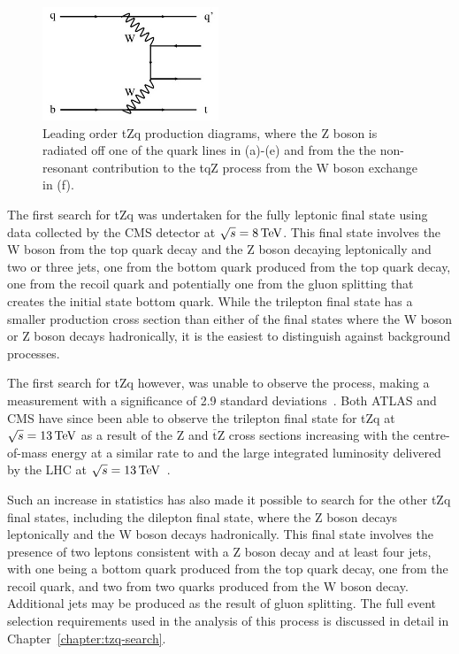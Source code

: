 \begin{figure}[p]
\includegraphics[width=0.47\textwidth]{figs/top-physics/tZq_feyn6.jpg}
\caption{Leading order tZq production diagrams, where the Z boson is radiated off one of the quark lines in (a)-(e) and from the the non-resonant contribution to the tqZ process from the W boson exchange in (f).}
\label{fig:feyn_tZq}
\end{figure}

The first search for tZq was undertaken for the fully leptonic final state using data collected by the CMS detector at $\sqrt{s} = 8\,\text{Te\hspace{-.08em}V}$.
This final state involves the W boson from the top quark decay and the Z boson decaying leptonically and two or three jets, one from the bottom quark produced from the top quark decay, one from the recoil quark and potentially one from the gluon splitting that creates the initial state bottom quark.
While the trilepton final state has a smaller production cross section than either of the final states where the W boson or Z boson decays hadronically, it is the easiest to distinguish against background processes.

The first search for tZq however, was unable to observe the process, making a measurement with a significance of 2.9 standard deviations~\cite{Sirunyan:2017kkr}.
Both ATLAS and CMS have since been able to observe the trilepton final state for tZq at $\sqrt{s} = 13\,\text{Te\hspace{-.08em}V}$ as a result of the Z and $\overline{\text{t}}$Z cross sections increasing with the centre-of-mass energy at a similar rate to \ttZ and the large integrated luminosity delivered by the LHC at $\sqrt{s} = 13\,\text{Te\hspace{-.08em}V}$~\cite{Aaboud:2017ylb,Sirunyan:2017nbr}.

Such an increase in statistics has also made it possible to search for the other tZq final states, including the dilepton final state, where the Z boson decays leptonically and the W boson decays hadronically.
This final state involves the presence of two leptons consistent with a Z boson decay and at least four jets, with one being a bottom quark produced from the top quark decay, one from the recoil quark, and two from two quarks produced from the W boson decay.
Additional jets may be produced as the result of gluon splitting.
The full event selection requirements used in the analysis of this process is discussed in detail in Chapter~\ref{chapter:tzq-search}.

